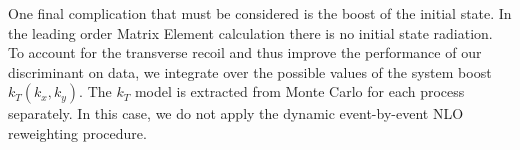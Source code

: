 One final complication that must be considered is the boost of the initial state.
In the leading order Matrix Element calculation there is no initial state radiation. 
To account for the transverse recoil and thus improve the performance of our discriminant
on data, we integrate over the possible values of the system boost $k_{T}(k_{x},k_{y})$. 
The $k_T$ model is extracted from Monte Carlo for each process separately. 
In this case, we do not apply the dynamic event-by-event NLO reweighting procedure. 




